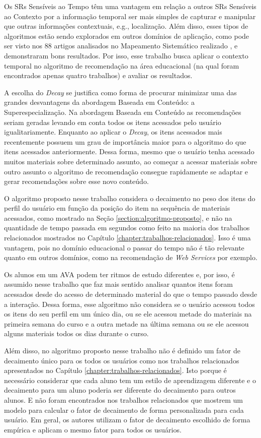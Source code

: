 Os SRs Sensíveis ao Tempo têm uma vantagem em relação a outros SRs Sensíveis ao Contexto por a informação temporal ser
mais simples de capturar e manipular que outras informações contextuais, e.g., localização. Além disso, esses tipos de
algoritmos estão sendo explorados em outros domínios de aplicação, como pode ser visto nos 88 artigos analisados no
Mapeamento Sistemático realizado \cite{de2017time}, e demonstraram bons resultados. Por isso, esse trabalho busca
aplicar o contexto temporal no algoritmo de recomendação na área educacional (na qual foram encontrados apenas quatro
trabalhos) e avaliar os resultados.

A escolha do \textit{Decay} se justifica como forma de procurar minimizar uma das grandes desvantagens da abordagem Baseada em Conteúdo: a
Superespecialização. Na abordagem Baseada em Conteúdo as recomendações seriam geradas levando em conta todos os itens
acessados pelo usuário igualitariamente. Enquanto ao aplicar o \textit{Decay}, os itens acessados mais recentemente possuem um
grau de importância maior para o algoritmo do que itens acessados anteriormente. Dessa forma, mesmo que o usuário
tenha acessado muitos materiais sobre determinado assunto, ao começar a acessar materiais sobre outro assunto o algoritmo de
recomendação consegue rapidamente se adaptar e gerar recomendações sobre esse novo conteúdo.

O algoritmo proposto nesse trabalho considera o decaimento no peso dos itens do perfil do usuário em função da posição
do item na sequência de materiais acessados, como mostrado na Seção \ref{section:algoritmo-proposto}, e não na quantidade de tempo passada em
segundos como feito na maioria dos trabalhos relacionados mostrados no Capítulo \ref{chapter:trabalhos-relacionados}. Isso é uma vantagem, pois no domínio
educacional o passar do tempo não é tão relevante quanto em outros domínios, como na recomendação de \textit{Web Services} por
exemplo.

Os alunos em um AVA podem ter ritmos de estudo diferentes e, por isso, é assumido nesse trabalho que faz
mais sentido analisar quantos itens foram acessados desde do acesso de determinado material do que o tempo passado desde
a interação. Dessa forma, esse algoritmo não considera se o usuário acessou todos os itens do seu perfil em um
único dia, ou se ele acessou metade do materiais na primeira semana do curso e a outra metade na última semana ou se ele
acessou alguns materiais todos os dias durante o curso.

Além disso, no algoritmo proposto nesse trabalho não é definido um fator de decaimento único para os todos os usuários como nos trabalhos
relacionados apresentados no Capítulo \ref{chapter:trabalhos-relacionados}. Isto porque é necessário considerar
que cada aluno tem um estilo de aprendizagem diferente e o decaimento para um aluno poderia ser diferente do decaimento
para outros alunos. E não foram encontrados nos trabalhos relacionados que mostrem um modelo para calcular o fator de decaimento de forma
personalizada para cada usuário. Em geral, os autores utilizam o fator de decaimento escolhido de forma empírica e
aplicam o mesmo fator para todos os usuários.

